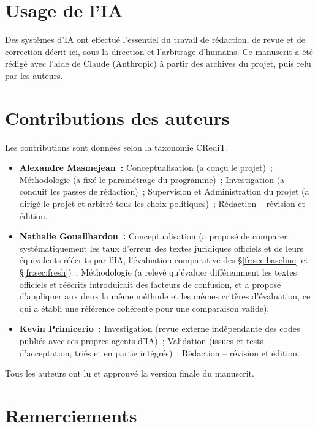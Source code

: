 \documentclass[11pt,a4paper]{article}
\begin{document}
\section*{Usage de l'IA}

Des systèmes d'IA ont effectué l'essentiel du travail de rédaction, de revue et de correction décrit ici, sous la direction et l'arbitrage d'humains. Ce manuscrit a été rédigé avec l'aide de Claude (Anthropic) à partir des archives du projet, puis relu par les auteurs.

\section*{Contributions des auteurs}

Les contributions sont données selon la taxonomie CRediT.
\begin{itemize}
  \item \textbf{Alexandre Masmejean~:} Conceptualisation (a conçu le projet)~; Méthodologie (a fixé le paramétrage du programme)~; Investigation (a conduit les passes de rédaction)~; Supervision et Administration du projet (a dirigé le projet et arbitré tous les choix politiques)~; Rédaction -- révision et édition.
  \item \textbf{Nathalie Gouailhardou~:} Conceptualisation (a proposé de comparer systématiquement les taux d'erreur des textes juridiques officiels et de leurs équivalents réécrits par l'IA, l'évaluation comparative des \S\ref{fr:sec:baseline} et \S\ref{fr:sec:fresh})~; Méthodologie (a relevé qu'évaluer différemment les textes officiels et réécrits introduirait des facteurs de confusion, et a proposé d'appliquer aux deux la même méthode et les mêmes critères d'évaluation, ce qui a établi une référence cohérente pour une comparaison valide).
  \item \textbf{Kevin Primicerio~:} Investigation (revue externe indépendante des codes publiés avec ses propres agents d'IA)~; Validation (issues et tests d'acceptation, triés et en partie intégrés)~; Rédaction -- révision et édition.
\end{itemize}
Tous les auteurs ont lu et approuvé la version finale du manuscrit.

\section*{Remerciements}
\end{document}
